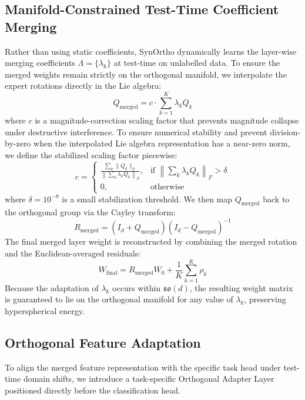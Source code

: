 \documentclass{article}
\theoremstyle{plain}
\theoremstyle{definition}
\theoremstyle{remark}
\begin{document}
\subsection{Manifold-Constrained Test-Time Coefficient Merging}
Rather than using static coefficients, SynOrtho dynamically learns the layer-wise merging coefficients $\Lambda = \{\lambda_k\}$ at test-time on unlabelled data. To ensure the merged weights remain strictly on the orthogonal manifold, we interpolate the expert rotations directly in the Lie algebra:
\begin{equation}
Q_{\text{merged}} = c \cdot \sum_{k=1}^K \lambda_k Q_k
\end{equation}
where $c$ is a magnitude-correction scaling factor that prevents magnitude collapse under destructive interference. To ensure numerical stability and prevent division-by-zero when the interpolated Lie algebra representation has a near-zero norm, we define the stabilized scaling factor piecewise:
\begin{equation}
c = \begin{cases} 
\frac{\sum_k \|Q_k\|_F}{\left\|\sum_k \lambda_k Q_k\right\|_F}, & \text{if } \left\|\sum_k \lambda_k Q_k\right\|_F > \delta \\
0, & \text{otherwise}
\end{cases}
\end{equation}
where $\delta = 10^{-8}$ is a small stabilization threshold. We then map $Q_{\text{merged}}$ back to the orthogonal group via the Cayley transform:
\begin{equation}
R_{\text{merged}} = (I_d + Q_{\text{merged}})(I_d - Q_{\text{merged}})^{-1}
\end{equation}
The final merged layer weight is reconstructed by combining the merged rotation and the Euclidean-averaged residuals:
\begin{equation}
W_{\text{final}} = R_{\text{merged}} W_0 + \frac{1}{K} \sum_{k=1}^K \rho_k
\end{equation}
Because the adaptation of $\lambda_k$ occurs within $\mathfrak{so}(d)$, the resulting weight matrix is guaranteed to lie on the orthogonal manifold for any value of $\lambda_k$, preserving hyperspherical energy.

\subsection{Orthogonal Feature Adaptation}
To align the merged feature representation with the specific task head under test-time domain shifts, we introduce a task-specific Orthogonal Adapter Layer positioned directly before the classification head. 
\end{document}
